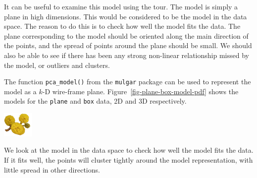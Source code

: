 \documentclass[
  letterpaper,
]{krantz}
\newcommand{\infobox}[1]{%
\noindent\colorbox{info!30}{%
\begin{minipage}{0.98\linewidth}%
    \centering%
    \begin{minipage}[c]{0.15\linewidth} %
      \includegraphics[width=1.5cm]{images/mulga-flowers2.png} %
    \end{minipage}%
    \hfill %
    \begin{minipage}[c]{0.8\linewidth} %
      \bigskip%
      \textsf{#1}%
      \bigskip%
    \end{minipage}%
    \hspace*{3mm}%
  \end{minipage}%
}%
}
\begin{document}
It can be useful to examine this model using the tour. The model is
simply a plane in high dimensions. This would be considered to be the
model in the data space. The reason to do this is to check how well the
model fits the data. The plane corresponding to the model should be
oriented along the main direction of the points, and the spread of
points around the plane should be small. We should also be able to see
if there has been any strong non-linear relationship missed by the
model, or outliers and clusters.

The function \texttt{pca\_model()} from the \texttt{mulgar} package can
be used to represent the model as a \(k\)-D wire-frame plane.
Figure~\ref{fig-plane-box-model-pdf} shows the models for the
\texttt{plane} and \texttt{box} data, 2D and 3D respectively.

\infobox{We look at the model in the data space to check how well the model fits the data. If it fits well, the points will cluster tightly around the model representation, with little spread in other directions.}
\end{document}
